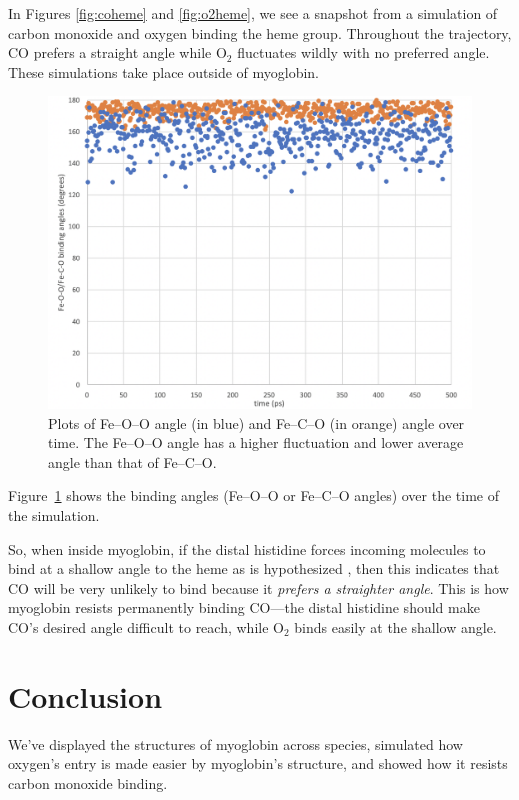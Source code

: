 \documentclass{article}
\begin{document}
In Figures \ref{fig:coheme} and \ref{fig:o2heme}, we see a snapshot from a simulation of carbon monoxide and oxygen binding the heme group.  Throughout the trajectory, CO prefers a straight angle while O$_2$ fluctuates wildly with no preferred angle.  These simulations take place outside of myoglobin.

\begin{figure}
  \centering
  \includegraphics[width=\textwidth]{angles.png}
  \caption{Plots of Fe--O--O angle (in blue) and Fe--C--O (in orange) angle over time.  The Fe--O--O angle has a higher fluctuation and lower average angle than that of Fe--C--O.}
  \label{fig:time}
\end{figure}

Figure~\ref{fig:time} shows the binding angles (Fe--O--O or Fe--C--O angles) over the time of the simulation.

So, when inside myoglobin, if the distal histidine forces incoming molecules to bind at a shallow angle to the heme as is hypothesized \cite{tutorial}, then this indicates that CO will be very unlikely to bind because it \emph{prefers a straighter angle}.  This is how myoglobin resists permanently binding CO---the distal histidine should make CO's desired angle difficult to reach, while O$_2$ binds easily at the shallow angle.

\section{Conclusion}

We've displayed the structures of myoglobin across species, simulated how oxygen's entry is made easier by myoglobin's structure, and showed how it resists carbon monoxide binding.
\end{document}
